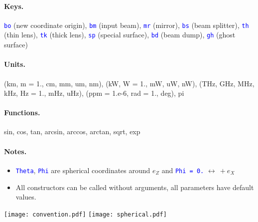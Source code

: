 \documentclass[a4paper, landscape]{article}
\renewcommand{\tt}[1]{\textcolor{blue}{\texttt{#1}}}
\begin{document}
\begin{multicols}{3}
\paragraph{Keys.} \tt{bo} (new coordinate origin), \tt{bm} (input beam), \tt{mr} (mirror), \tt{bs} (beam splitter), \tt{th} (thin lens), \tt{tk} (thick lens), \tt{sp} (special surface), \tt{bd} (beam dump), \tt{gh} (ghost surface)
\paragraph{Units.}(km, m = 1., cm, mm, um, nm), (kW, W = 1., mW, uW, nW), (THz, GHz, MHz, kHz, Hz = 1., mHz, uHz), (ppm = 1.e-6, rad = 1., deg), pi
\paragraph{Functions.} sin, cos, tan, arcsin, arccos, arctan, sqrt, exp


\paragraph{Notes.}\begin{itemize}
\item \tt{Theta}, \tt{Phi} are spherical coordinates around $e_Z$ and \tt{Phi = 0.} $\leftrightarrow~ + e_X$
\item All constructors can be called without arguments, all parameters have default values.
\end{itemize}

\texttt{[image: convention.pdf]}
\texttt{[image: spherical.pdf]}

\end{multicols}
\end{document}
